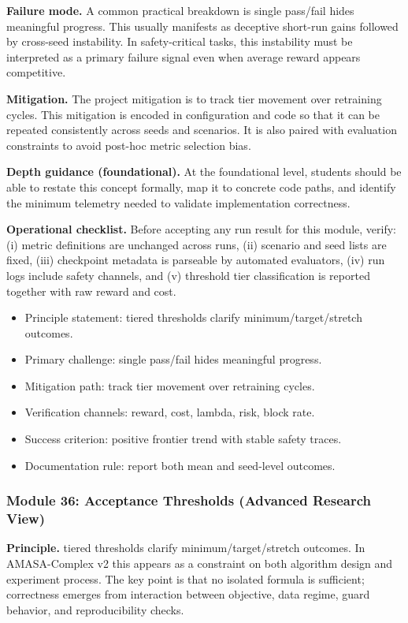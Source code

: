 \documentclass[conference]{IEEEtran}
\begin{document}
\textbf{Failure mode.} A common practical breakdown is single pass/fail hides meaningful progress. This usually manifests as deceptive short-run gains followed by cross-seed instability. In safety-critical tasks, this instability must be interpreted as a primary failure signal even when average reward appears competitive.

\textbf{Mitigation.} The project mitigation is to track tier movement over retraining cycles. This mitigation is encoded in configuration and code so that it can be repeated consistently across seeds and scenarios. It is also paired with evaluation constraints to avoid post-hoc metric selection bias.

\textbf{Depth guidance (foundational).} At the foundational level, students should be able to restate this concept formally, map it to concrete code paths, and identify the minimum telemetry needed to validate implementation correctness.

\textbf{Operational checklist.} Before accepting any run result for this module, verify: (i) metric definitions are unchanged across runs, (ii) scenario and seed lists are fixed, (iii) checkpoint metadata is parseable by automated evaluators, (iv) run logs include safety channels, and (v) threshold tier classification is reported together with raw reward and cost.

\begin{itemize}[leftmargin=*]
  \item Principle statement: tiered thresholds clarify minimum/target/stretch outcomes.
  \item Primary challenge: single pass/fail hides meaningful progress.
  \item Mitigation path: track tier movement over retraining cycles.
  \item Verification channels: reward, cost, lambda, risk, block rate.
  \item Success criterion: positive frontier trend with stable safety traces.
  \item Documentation rule: report both mean and seed-level outcomes.
\end{itemize}


\subsubsection{Module 36: Acceptance Thresholds (Advanced Research View)}
\textbf{Principle.} tiered thresholds clarify minimum/target/stretch outcomes. In AMASA-Complex v2 this appears as a constraint on both algorithm design and experiment process. The key point is that no isolated formula is sufficient; correctness emerges from interaction between objective, data regime, guard behavior, and reproducibility checks.
\end{document}
